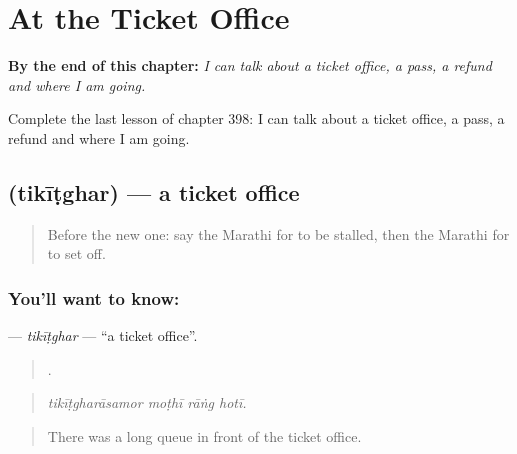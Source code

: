 
\chapter{At the Ticket Office}
\label{ch:mr-at-the-ticket-office}

\begin{chapteropening}
\textbf{By the end of this chapter:} \emph{I can talk about a ticket office, a pass, a refund and where I am going.}

Complete the last lesson of chapter 398: I can talk about a ticket office, a pass, a refund and where I am going.
\end{chapteropening}

\section[\texorpdfstring{\mr{तिकीटघर} (tikīṭghar)}{तिकीटघर (tikīṭghar)}]{ (tikīṭghar) — a ticket office}

\label{lesson:MR-C398-tikitghar}



\begin{quote}
Before the new one: say the Marathi for to be stalled, then the Marathi for to set off.
\end{quote}

\subsection*{You'll want to know: }
\textbf{} — \emph{tikīṭghar} — \textquotedblleft{}a ticket office\textquotedblright{}.

\begin{quote}
   .
\end{quote}

\begin{quote}
\emph{tikīṭgharāsamor moṭhī rāṅg hotī.}
\end{quote}

\begin{quote}
There was a long queue in front of the ticket office.
\end{quote}

